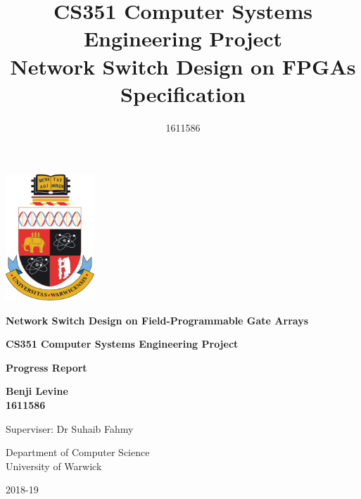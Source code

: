 \begin{titlepage}
   \begin{center}

      \includegraphics[width=0.25\textwidth]{warwick_logo_old.png}

      \vspace{1.5cm}
      \textbf{\Large{Network Switch Design on Field-Programmable Gate Arrays}}

      \vspace{1cm}
      \textbf{\large{CS351 Computer Systems Engineering Project}} \\
      \vspace{0.5cm}


      \textbf{\large{Progress Report}}

      \vspace{2.7cm}

      \textbf{Benji Levine} \\
      \vspace{0.1cm}
      \textbf{1611586}

      \vspace{2.7cm}

      Superviser: Dr Suhaib Fahmy

      \vspace{0.8cm}

      Department of Computer Science\\
      University of Warwick

      \vspace{0.7cm}

      2018-19

   \end{center}
\end{titlepage}


\title{CS351 Computer Systems Engineering Project \\ \vspace{0.5cm} Network Switch Design on FPGAs \\ \vspace{0.3cm} \Large{Specification}}
\author{1611586}
